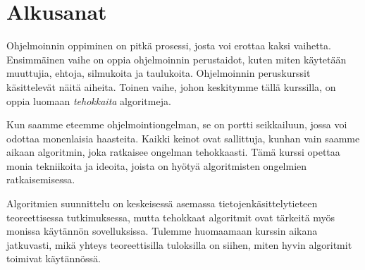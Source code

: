 \chapter{Alkusanat}

Ohjelmoinnin oppiminen on pitkä prosessi,
josta voi erottaa kaksi vaihetta.
Ensimmäinen vaihe on oppia ohjelmoinnin perustaidot,
kuten miten käyte\-tään muuttujia, ehtoja, silmukoita ja taulukoita.
Ohjelmoinnin peruskurssit käsittelevät näitä aiheita.
Toinen vaihe, johon keskitymme tällä kurssilla,
on oppia luomaan \emph{tehokkaita} algoritmeja.

Kun saamme eteemme ohjelmointiongelman,
se on portti seikkailuun, jossa voi odottaa monenlaisia haasteita.
Kaikki keinot ovat sallittuja, kunhan vain saamme aikaan
algoritmin, joka ratkaisee ongelman tehokkaasti.
Tämä kurssi opettaa monia tekniikoita ja ideoita,
joista on hyötyä algoritmisten ongelmien ratkaisemisessa.

Algoritmien suunnittelu on keskeisessä asemassa tietojenkäsittelytieteen
teoreettisessa tutkimuksessa, mutta tehokkaat algoritmit ovat
tärkeitä myös monissa käytännön sovelluksissa.
Tulemme huomaamaan kurssin aikana jatkuvasti,
mikä yhteys teoreettisilla tuloksilla on siihen,
miten hyvin algoritmit toimivat käytännössä.
